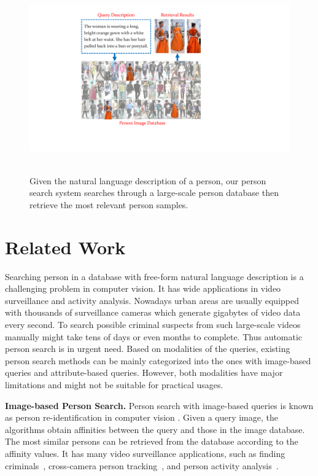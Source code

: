 \begin{figure}
\begin{center}
\includegraphics[width=0.8\linewidth]{figures/person_nlp/intro.pdf} \ \\
\end{center}
\vspace{-8pt}
\caption{Given the natural language description of a person, our person search system searches through a large-scale person database then retrieve the most relevant person samples. }
\vspace{-7pt}
\label{fig:demo}
\end{figure}

\section{Related Work} %
\label{sec:ps-related-work}
Searching person in a database with free-form natural language description is a challenging problem in computer vision. It has wide applications in video surveillance and activity analysis. Nowadays urban areas are usually equipped with thousands of surveillance cameras which generate gigabytes of video data every second. To search possible criminal suspects from such large-scale videos manually might take tens of days or even months to complete. Thus automatic person search is in urgent need. Based on modalities of the queries, existing person search methods can be mainly categorized into the ones with image-based queries and attribute-based queries. However, both modalities have major limitations and might not be suitable for practical usages. 

\textbf{Image-based Person Search.} Person search with image-based queries is known as person re-identification in computer vision \cite{zheng2011person,liao2015person,xiao2016end}. Given a query image, the algorithms obtain affinities between the query and those in the image database. The most similar persons can be retrieved from the database according to the affinity values. It has many video surveillance applications, such as finding criminals~\cite{wang2013intelligent}, cross-camera person tracking~\cite{yu2013harry}, and person activity analysis~\cite{loy2009multi}. 

